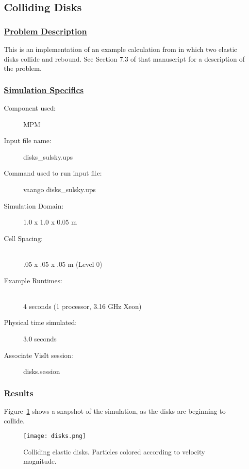 \newpage
\subsection*{\center Colliding Disks}
\subsubsection*{\underline{Problem Description}}
This is an implementation of an example calculation from \cite{Sulsky1994} in
which two elastic disks collide and rebound.  See Section 7.3 of that
manuscript for a description of the problem.
 
\subsubsection*{\underline{Simulation Specifics}}
\begin{description} 
\item [Component used:] \hfill MPM
\item [Input file name:] \hfill disks\_sulsky.ups
\item [Command used to run input file:]\hfill vaango disks\_sulsky.ups
\item [Simulation Domain:]\hfill    1.0 x 1.0 x 0.05 m

\item [Cell Spacing:]\hfill \\ 
.05 x .05 x .05 m (Level 0)

\item [Example Runtimes:] \hfill \\
 4 seconds  (1 processor, 3.16 GHz Xeon)\\

\item [Physical time simulated:] \hfill 3.0 seconds

\item [Associate VisIt session:] \hfill disks.session

\end{description}

\subsubsection*{\underline{Results}}

Figure~\ref{figdisks} shows a snapshot of the simulation, as the disks
are beginning to collide.
\begin{figure}
  \center
  \texttt{[image: disks.png]}
  \caption{Colliding elastic disks.  Particles colored according to
velocity magnitude.}
  \label{figdisks}
\end{figure}

